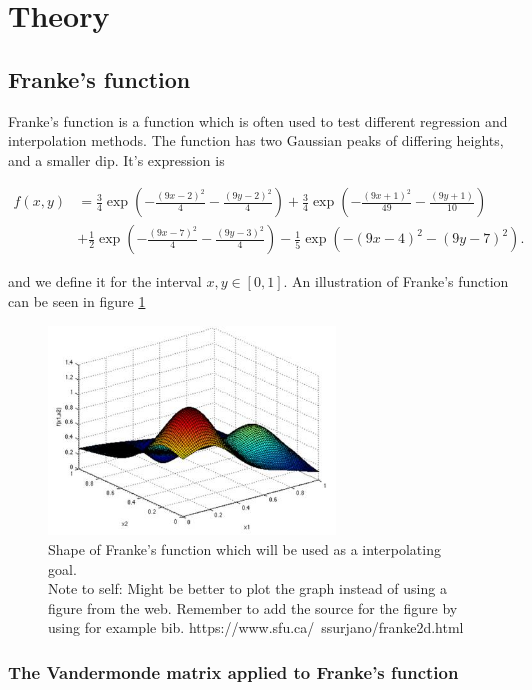 \documentclass[../main.tex]{subfiles}
\begin{document}
\section{Theory}\label{sec:theory}

\subsection{Franke's function}
Franke's function is a function which is often used to test different regression and interpolation methods. The function has two Gaussian peaks of differing heights, and a smaller dip. It's expression is

\begin{align*}
  f(x,y) &= \frac{3}{4}\exp{\left(-\frac{(9x-2)^2}{4} - \frac{(9y-2)^2}{4}\right)}+\frac{3}{4}\exp{\left(-\frac{(9x+1)^2}{49}- \frac{(9y+1)}{10}\right)} \\
  &+\frac{1}{2}\exp{\left(-\frac{(9x-7)^2}{4} - \frac{(9y-3)^2}{4}\right)} -\frac{1}{5}\exp{\left(-(9x-4)^2 - (9y-7)^2\right) }.
\end{align*}

and we define it for the interval $x,y\in[0,1]$. An illustration of Franke's function can be seen in figure \ref{fig:frankesplot}

\begin{figure}
  \centering
  \includegraphics[width = 3in]{frankesfunction_plot.png}
  \caption{Shape of Franke's function which will be used as a interpolating goal.
  \\Note to self: Might be better to plot the graph instead of using a figure from the web. Remember to add the source for the figure by using for example bib. https://www.sfu.ca/~ssurjano/franke2d.html}
  \label{fig:frankesplot}
\end{figure}

\subsubsection{The Vandermonde matrix applied to Franke's function}
\end{document}
